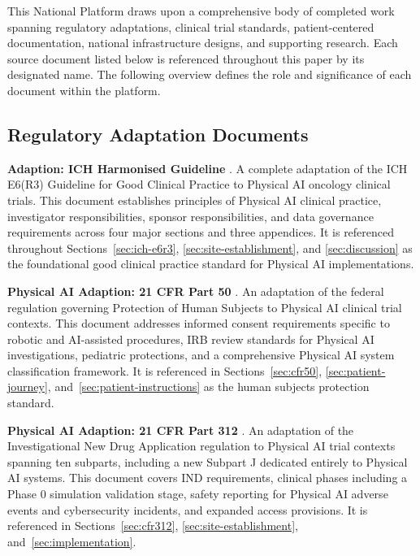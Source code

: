 \thispagestyle{acknowledgements}

This National Platform draws upon a comprehensive body of completed work
spanning regulatory adaptations, clinical trial standards, patient-centered
documentation, national infrastructure designs, and supporting research. Each
source document listed below is referenced throughout this paper by its
designated name. The following overview defines the role and significance of
each document within the platform.

\subsection*{Regulatory Adaptation Documents}

\noindent\textbf{Adaption: ICH Harmonised Guideline} \cite{ich-adapt}.
A complete adaptation of the ICH E6(R3) Guideline for Good Clinical Practice
to Physical AI oncology clinical trials. This document establishes principles
of Physical AI clinical practice, investigator responsibilities, sponsor
responsibilities, and data governance requirements across four major sections
and three appendices. It is referenced throughout Sections~\ref{sec:ich-e6r3},
\ref{sec:site-establishment}, and \ref{sec:discussion} as the foundational
good clinical practice standard for Physical AI implementations.

\vspace{0.3cm}
\noindent\textbf{Physical AI Adaption: 21 CFR Part 50} \cite{cfr50-adapt}.
An adaptation of the federal regulation governing Protection of Human Subjects
to Physical AI clinical trial contexts. This document addresses informed
consent requirements specific to robotic and AI-assisted procedures, IRB review
standards for Physical AI investigations, pediatric protections, and a
comprehensive Physical AI system classification framework. It is referenced in
Sections~\ref{sec:cfr50}, \ref{sec:patient-journey},
and~\ref{sec:patient-instructions} as the human subjects protection standard.

\vspace{0.3cm}
\noindent\textbf{Physical AI Adaption: 21 CFR Part 312} \cite{cfr312-adapt}.
An adaptation of the Investigational New Drug Application regulation to Physical
AI trial contexts spanning ten subparts, including a new Subpart J dedicated
entirely to Physical AI systems. This document covers IND requirements, clinical
phases including a Phase 0 simulation validation stage, safety reporting for
Physical AI adverse events and cybersecurity incidents, and expanded access
provisions. It is referenced in Sections~\ref{sec:cfr312},
\ref{sec:site-establishment}, and~\ref{sec:implementation}.

